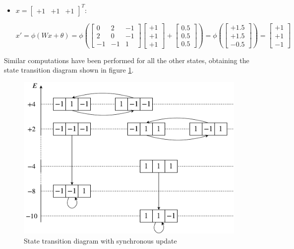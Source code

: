 \documentclass[letterpaper,headings=standardclasses]{scrartcl}
\begin{document}
\begin{itemize}
    \item $x = [\begin{matrix} +1 & +1 & +1 \end{matrix}]^T$:
    
    $$ x' = \phi(Wx + \theta) = \phi \left( \left[ \begin{matrix} 0 & 2 & -1 \\ 2 & 0 & -1 \\ -1 & -1 & 1 \end{matrix} \right] \left[ \begin{matrix} +1 \\ +1 \\ +1 \end{matrix} \right] + \left[ \begin{matrix} 0.5 \\ 0.5 \\ 0.5 \end{matrix} \right] \right) = \phi \left( \left[ \begin{matrix} +1.5 \\ +1.5 \\ -0.5 \end{matrix} \right] \right) = \left[ \begin{matrix} +1 \\ +1 \\ -1 \end{matrix} \right] $$
\end{itemize}

Similar computations have been performed for all the other states, obtaining the state transition diagram shown in figure \ref{sync}.

\begin{figure}[h]
    \centering
    \includegraphics[width=0.7\linewidth]{sync.pdf}
    \caption{State transition diagram with synchronous update}
    \label{sync}
\end{figure}
\end{document}
